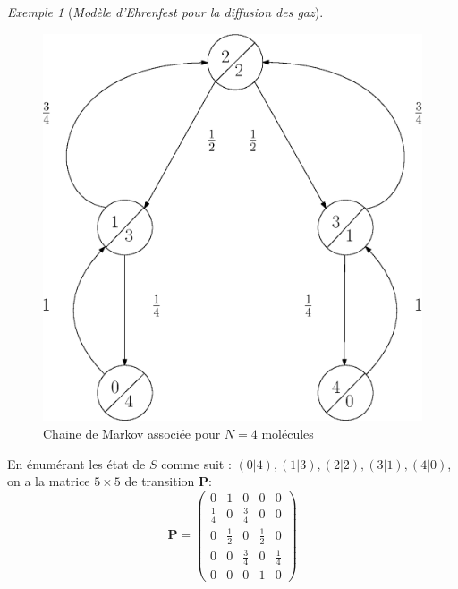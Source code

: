 \documentclass[12pt,a4paper]{report}
\theoremstyle{definition}%
\theoremstyle{remark}
\newtheorem{example}{Exemple}[chapter]
\begin{document}
\begin{example}[\textit{Modèle d'Ehrenfest pour la diffusion des gaz}]
\begin{figure}[H]
		\includegraphics[scale=0.4]{figures/Ehrenfest.eps}
		\caption{Chaine de Markov associée pour $N=4$ molécules}
		\label{ehrenfestMC}
	\end{figure}
	En énumérant les état de $S$ comme suit : $(0|4), (1|3), (2|2), (3|1), (4|0)$, on a la matrice $5\times5$ de transition $\textbf{P}$:
	\[
		\textbf{P} =
			\begin{pmatrix}
			0 & 1 & 0 & 0 & 0 \\
			\frac{1}{4} & 0 & \frac{3}{4}& 0 & 0 \\
			0 & \frac{1}{2} & 0 & \frac{1}{2} & 0 \\
			0 & 0 & \frac{3}{4} & 0 & \frac{1}{4} \\
			0 & 0 & 0 & 1 & 0
			\end{pmatrix}
	\]
\end{example}
\end{document}
